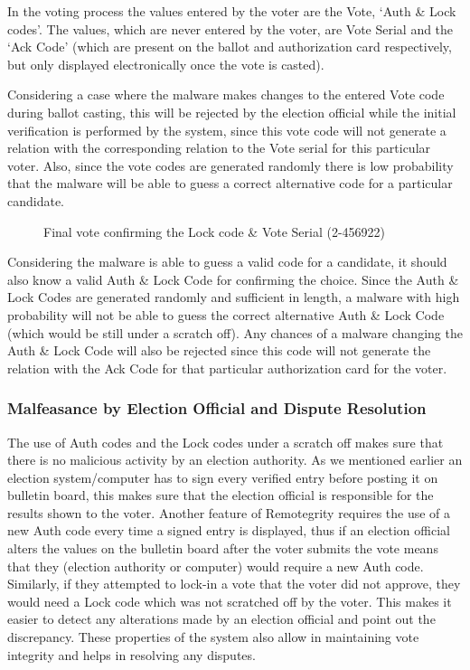 In the voting process the values entered by the voter are the Vote,
`Auth \& Lock codes'. The values, which are never entered by the
voter, are Vote Serial and the `Ack Code' (which are present on the
ballot and authorization card respectively, but only displayed
electronically once the vote is casted).

Considering a case where the malware makes changes to the entered Vote
code during ballot casting, this will be rejected by the election
official while the initial verification is performed by the system,
since this vote code will not generate a relation with the
corresponding relation to the Vote serial for this particular
voter. Also, since the vote codes are generated randomly there is low
probability that the malware will be able to guess a correct
alternative code for a particular candidate.

\begin{figure}
  \centering {}
  \caption{Final vote confirming the Lock code \& Vote Serial
    (2-456922)}
  \label{fig:remotegrity-lock}
\end{figure}

Considering the malware is able to guess a valid code for a candidate,
it should also know a valid Auth \& Lock Code for confirming the
choice. Since the Auth \& Lock Codes are generated randomly and
sufficient in length, a malware with high probability will not be able
to guess the correct alternative Auth \& Lock Code (which would be
still under a scratch off). Any chances of a malware changing the Auth
\& Lock Code will also be rejected since this code will not generate
the relation with the Ack Code for that particular authorization card
for the voter.

\subsubsection{Malfeasance by Election Official and Dispute Resolution}

The use of Auth codes and the Lock codes under a scratch off makes
sure that there is no malicious activity by an election authority. As
we mentioned earlier an election system/computer has to sign every
verified entry before posting it on bulletin board, this makes sure
that the election official is responsible for the results shown to the
voter. Another feature of Remotegrity requires the use of a new Auth
code every time a signed entry is displayed, thus if an election
official alters the values on the bulletin board after the voter
submits the vote means that they (election authority or computer)
would require a new Auth code. Similarly, if they attempted to lock-in
a vote that the voter did not approve, they would need a Lock code
which was not scratched off by the voter. This makes it easier to
detect any alterations made by an election official and point out the
discrepancy. These properties of the system also allow in maintaining
vote integrity and helps in resolving any disputes.

